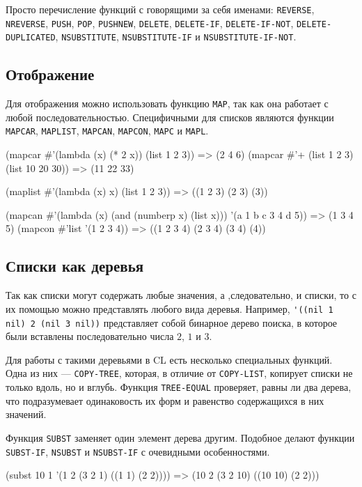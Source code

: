 Просто перечисление функций с говорящими за себя именами: \lstinline{REVERSE}, \lstinline{NREVERSE}, \lstinline{PUSH}, \lstinline{POP}, \lstinline{PUSHNEW}, \lstinline{DELETE}, \lstinline{DELETE-IF}, \lstinline{DELETE-IF-NOT}, \lstinline{DELETE-DUPLICATED}, \lstinline{NSUBSTITUTE}, \lstinline{NSUBSTITUTE-IF} и \lstinline{NSUBSTITUTE-IF-NOT}.

\subsection{Отображение}
Для отображения можно использовать функцию \lstinline{MAP}, так как она работает с любой последовательностью. Специфичными для списков являются функции \lstinline{MAPCAR}, \lstinline{MAPLIST}, \lstinline{MAPCAN}, \lstinline{MAPCON}, \lstinline{MAPC} и \lstinline{MAPL}.
\begin{cllst}{}{}
(mapcar #'(lambda (x) (* 2 x)) (list 1 2 3)) => (2 4 6)
(mapcar #'+ (list 1 2 3) (list 10 20 30))    => (11 22 33)

(maplist #'(lambda (x) x) (list 1 2 3)) => ((1 2 3) (2 3) (3))

(mapcan #'(lambda (x) (and (numberp x) (list x)))
          '(a 1 b c 3 4 d 5))
=>  (1 3 4 5)
(mapcon #'list '(1 2 3 4)) =>  ((1 2 3 4) (2 3 4) (3 4) (4))
\end{cllst}

\subsection{Списки как деревья}
Так как списки могут содержать любые значения, а ,следовательно, и списки, то с их помощью можно представлять любого вида деревья. Например, \lstinline{'((nil 1 nil) 2 (nil 3 nil))} представляет собой бинарное дерево поиска, в которое были вставлены последовательно числа $2$, $1$ и $3$.

Для работы с такими деревьями в CL есть несколько специальных функций. Одна из них — \lstinline{COPY-TREE}, которая, в отличие от \lstinline{COPY-LIST}, копирует списки не только вдоль, но и вглубь. Функция \lstinline{TREE-EQUAL} проверяет, равны ли два дерева, что подразумевает одинаковость их форм и равенство содержащихся в них значений.

Функция \lstinline{SUBST} заменяет один элемент дерева другим. Подобное делают функции \lstinline{SUBST-IF}, \lstinline{NSUBST} и \lstinline{NSUBST-IF} с очевидными особенностями.
\begin{cllst}{}{}
(subst 10 1 '(1 2 (3 2 1) ((1 1) (2 2)))) => (10 2 (3 2 10) ((10 10) (2 2)))
\end{cllst}

